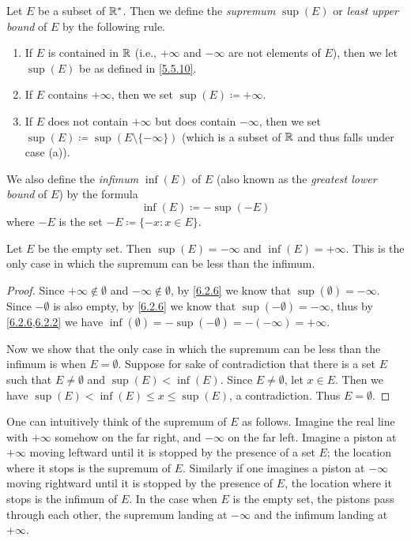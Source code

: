 \begin{defn}\label{6.2.6}
  Let \(E\) be a subset of \(\mathbb{R}^*\).
  Then we define the \emph{supremum} \(\sup(E)\) or \emph{least upper bound} of \(E\) by the following rule.
  \begin{enumerate}
    \item If \(E\) is contained in \(\mathbb{R}\) (i.e., \(+\infty\) and \(-\infty\) are not elements of \(E\)), then we let \(\sup(E)\) be as defined in \cref{5.5.10}.
    \item If \(E\) contains \(+\infty\), then we set \(\sup(E) \coloneqq +\infty\).
    \item If \(E\) does not contain \(+\infty\) but does contain \(-\infty\), then we set \(\sup(E) \coloneqq \sup(E \setminus \{-\infty\})\)
          (which is a subset of \(\mathbb{R}\) and thus falls under case (a)).
  \end{enumerate}
  We also define the \emph{infimum} \(\inf(E)\) of \(E\) (also known as the \emph{greatest lower bound} of \(E\)) by the formula
  \[
    \inf(E) \coloneqq -\sup(-E)
  \]
  where \(-E\) is the set \(-E \coloneqq \{-x : x \in E\}\).
\end{defn}

\setcounter{thm}{9}
\begin{eg}\label{6.2.10}
  Let \(E\) be the empty set.
  Then \(\sup(E) = -\infty\) and \(\inf(E) = +\infty\).
  This is the only case in which the supremum can be less than the infimum.
\end{eg}

\begin{proof}
  Since \(+\infty \notin \emptyset\) and \(-\infty \notin \emptyset\), by \cref{6.2.6} we know that \(\sup(\emptyset) = -\infty\).
  Since \(-\emptyset\) is also empty, by \cref{6.2.6} we know that \(\sup(-\emptyset) = -\infty\), thus by \cref{6.2.6,6.2.2} we have \(\inf(\emptyset) = -\sup(-\emptyset) = -(-\infty) = +\infty\).

  Now we show that the only case in which the supremum can be less than the infimum is when \(E = \emptyset\).
  Suppose for sake of contradiction that there is a set \(E\) such that \(E \neq \emptyset\) and \(\sup(E) < \inf(E)\).
  Since \(E \neq \emptyset\), let \(x \in E\).
  Then we have \(\sup(E) < \inf(E) \leq x \leq \sup(E)\), a contradiction.
  Thus \(E = \emptyset\).
\end{proof}

\begin{note}
  One can intuitively think of the supremum of \(E\) as follows.
  Imagine the real line with \(+\infty\) somehow on the far right, and \(-\infty\) on the far left.
  Imagine a piston at \(+\infty\) moving leftward until it is stopped by the presence of a set \(E\);
  the location where it stops is the supremum of \(E\).
  Similarly if one imagines a piston at \(-\infty\) moving rightward until it is stopped by the presence of \(E\), the location where it stops is the infimum of \(E\).
  In the case when \(E\) is the empty set, the pistons pass through each other, the supremum landing at \(-\infty\) and the infimum landing at \(+\infty\).
\end{note}

